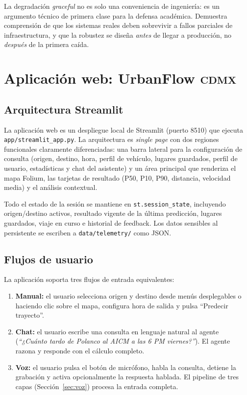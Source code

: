 \documentclass[11pt,a4paper]{article}
\newcommand{\CDMX}{\textsc{cdmx}}
\begin{document}
\begin{tipbox}
La degradación \emph{graceful} no es solo una conveniencia de
ingeniería: es un argumento técnico de primera clase para la
defensa académica. Demuestra comprensión de que los sistemas
reales deben sobrevivir a fallos parciales de infraestructura, y
que la robustez se diseña \emph{antes} de llegar a producción,
no \emph{después} de la primera caída.
\end{tipbox}

\section{Aplicación web: UrbanFlow \CDMX}
\label{sec:app}

\subsection{Arquitectura Streamlit}

La aplicación web es un despliegue local de Streamlit (puerto
\num{8510}) que ejecuta
\texttt{app/streamlit\_app.py}. La arquitectura es \emph{single
page} con dos regiones funcionales claramente diferenciadas:
una barra lateral para la configuración de consulta
(origen, destino, hora, perfil de vehículo, lugares guardados,
perfil de usuario, estadísticas y chat del asistente) y un área
principal que renderiza el mapa Folium, las tarjetas de
resultado (P50, P10, P90, distancia, velocidad media) y el
análisis contextual.

Todo el estado de la sesión se mantiene en
\texttt{st.session\_state}, incluyendo origen/destino activos,
resultado vigente de la última predicción, lugares guardados,
viaje en curso e historial de feedback. Los datos sensibles al
persistente se escriben a \texttt{data/telemetry/} como JSON.

\subsection{Flujos de usuario}

La aplicación soporta tres flujos de entrada equivalentes:

\begin{enumerate}
\item \textbf{Manual:} el usuario selecciona origen y destino
desde menús desplegables o haciendo clic sobre el mapa,
configura hora de salida y pulsa ``Predecir trayecto''.
\item \textbf{Chat:} el usuario escribe una consulta en lenguaje
natural al agente (\emph{``¿Cuánto tardo de Polanco al AICM a las
6 PM viernes?''}). El agente razona y responde con el cálculo
completo.
\item \textbf{Voz:} el usuario pulsa el botón de micrófono, habla
la consulta, detiene la grabación y activa opcionalmente la
respuesta hablada. El pipeline de tres capas
(Sección~\ref{sec:voz}) procesa la entrada completa.
\end{enumerate}
\end{document}
